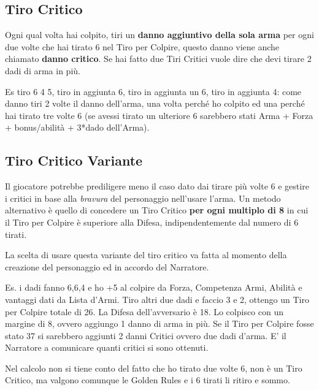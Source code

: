 \begin{multicols}{2}
\subsection{Tiro Critico}\label{tirocritico}

Ogni qual volta hai colpito, tiri un \textbf{danno aggiuntivo della sola arma} per ogni due volte che hai tirato 6 nel Tiro per Colpire, questo danno viene anche chiamato \textbf{danno critico}. Se hai fatto due Tiri Critici vuole dire che devi tirare 2 dadi di arma in più.

\begin{changemargin}{0.3cm}{0.3cm}\begin{tcolorbox}[title = Esempio Tiro Critico]
Es tiro 6 4 5, tiro in aggiunta 6, tiro in aggiunta un 6, tiro in aggiunta 4: come danno tiri 2 volte il danno dell'arma, una volta perché ho colpito ed una perché hai tirato tre volte 6 (se avessi tirato un ulteriore 6 sarebbero stati Arma + Forza + bonus/abilità + 3{*}dado dell'Arma).
\end{tcolorbox}\end{changemargin}

\subsection{Tiro Critico Variante}\hypertarget{tirocriticovariante}{}\label{tirocriticovariante}

Il giocatore potrebbe prediligere meno il caso dato dai tirare più volte 6 e gestire i critici in base alla \emph{bravura} del personaggio nell'usare l'arma.
Un metodo alternativo è quello di concedere un Tiro Critico \textbf{per ogni multiplo di 8} in cui il Tiro per Colpire è superiore alla Difesa, indipendentemente dal numero di 6 tirati.

La scelta di usare questa variante del tiro critico va fatta al momento della creazione del personaggio ed in accordo del Narratore.

Es. i dadi fanno 6,6,4 e ho +5 al colpire da Forza, Competenza Armi, Abilità e vantaggi dati da Lista d'Armi. Tiro altri due dadi e faccio 3 e 2, ottengo un Tiro per Colpire totale di 26. La Difesa dell'avversario è 18. Lo colpisco con un margine di 8, ovvero aggiungo 1 danno di arma in più. Se il Tiro per Colpire fosse stato 37 si sarebbero aggiunti 2 danni Critici ovvero due dadi d'arma.
E' il Narratore a comunicare quanti critici si sono ottenuti.

Nel calcolo non si tiene conto del fatto che ho tirato due volte 6, non è un Tiro Critico, ma valgono comunque le Golden Rules e i 6 tirati li ritiro e sommo.


\end{multicols}
